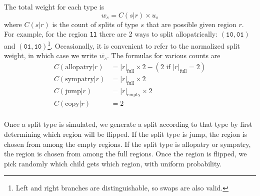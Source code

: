 \documentclass[a4paper]{article}
\newcommand{\CountFull}[1]{|#1|_\text{full}}
\newcommand{\CountEmpty}[1]{|#1|_\text{empty}}
\begin{document}
The total weight for each type is
\begin{equation}
	w_s = C(s|r) \times u_s
\end{equation}
where $C(s|r)$ is the count of splits of type $s$ that are
possible given region $r$.
For example, for the region \texttt{11} there are 2 ways to split
allopatrically: $(\texttt{10}, \texttt{01})$ and $(\texttt{01},
\texttt{10})$\footnote{Left and right branches are distinguishable, so swaps
	are also valid.}\footnotemark.
Occasionally, it is convenient to refer to the normalized split weight, in
which case we write \( \overline{w_s} \).
The formulas for various counts are
\begin{align*}
  C(\text{allopatry}|r) & =
  \CountFull{r} \times 2 - (2 \text{ if } \CountFull{r} = 2) \\
  C(\text{sympatry}|r)  & = \CountFull{r} \times 2           \\ C(\text{jump}|r) & =
  \CountEmpty{r} \times 2                                    \\ C(\text{copy}|r) & = 2 \\
\end{align*}


Once a split type is simulated, we generate
a split according to that type by first determining which region will be
flipped\footnotemark.
If the split type is jump, the region is chosen from among the empty regions.
If the split type is allopatry or sympatry, the region is chosen from among the
full regions.
Once the region is flipped, we pick randomly which child gets which region,
with uniform probability.

\end{document}
